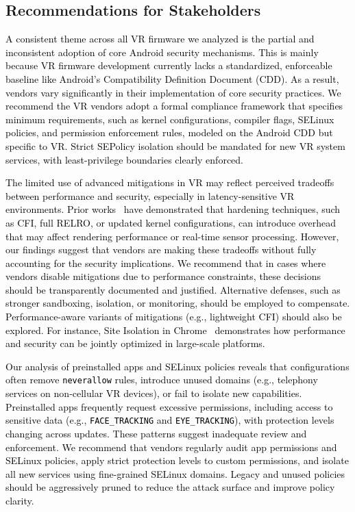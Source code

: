 \documentclass[sigconf]{acmart}
\newcommand{\bheading}[1]{{\vspace{2pt}\noindent{\textbf{#1}}}}
\newcommand{\cc}[1]{\mbox{\smaller[0.5]\texttt{#1}}}
\newcommand{\rev}[1]{\textcolor{black}{#1}}
\begin{document}
\subsection{Recommendations for  Stakeholders}

\bheading{For vendors.}
\rev{
A consistent theme across all VR firmware we analyzed is the partial and inconsistent adoption of core Android security mechanisms.
This is mainly because VR firmware development currently lacks a standardized, enforceable baseline like Android’s Compatibility Definition Document (CDD).
As a result, vendors vary significantly in their implementation of core security practices.
We recommend the VR vendors adopt a formal compliance framework that specifies minimum requirements, such as kernel configurations, compiler flags, SELinux policies, and permission enforcement rules, modeled on the Android CDD but specific to VR.
Strict SEPolicy isolation should be mandated for new VR system services, with least-privilege boundaries clearly enforced.
}

\rev{
The limited use of advanced mitigations in VR may reflect perceived tradeoffs between performance and security, especially in latency-sensitive VR environments.
Prior works~\cite{Sidhpurwala_RELRO, zhang2013practical, maar2024defects} have demonstrated that hardening techniques, such as CFI, full RELRO, or updated kernel configurations, can introduce overhead that may affect rendering performance or real-time sensor processing.
However, our findings suggest that vendors are making these tradeoffs without fully accounting for the security implications.
We recommend that in cases where vendors disable mitigations due to performance constraints, these decisions should be transparently documented and justified.
Alternative defenses, such as stronger sandboxing, isolation, or monitoring, should be employed to compensate.
Performance-aware variants of mitigations (e.g., lightweight CFI) should also be explored.
For instance, Site Isolation in Chrome~\cite{reis2019site} demonstrates how performance and security can be jointly optimized in large-scale platforms.}

\rev{
Our analysis of preinstalled apps and SELinux policies reveals that configurations often remove \cc{neverallow} rules, introduce unused domains (e.g., telephony services on non-cellular VR devices), or fail to isolate new capabilities.
Preinstalled apps frequently request excessive permissions, including access to sensitive data (e.g., \cc{FACE\_TRACKING} and \cc{EYE\_TRACKING}), with protection levels changing across updates. These patterns suggest inadequate review and enforcement.
We recommend that vendors regularly audit app permissions and SELinux policies, apply strict protection levels to custom permissions, and isolate all new services using fine-grained SELinux domains.
Legacy and unused policies should be aggressively pruned to reduce the attack surface and improve policy clarity.
}
\end{document}
